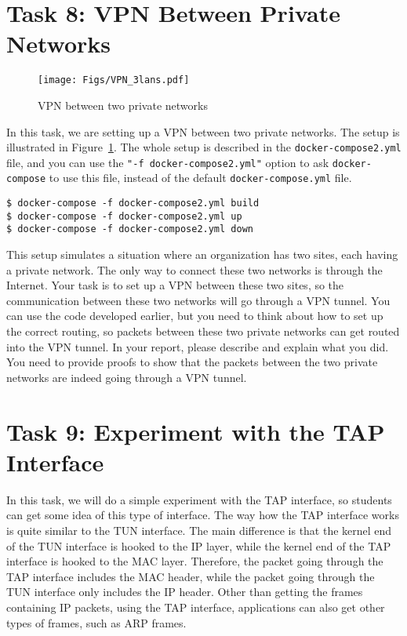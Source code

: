 \section{Task 8: VPN Between Private Networks} 


\begin{figure}[htb]
\begin{center}
\texttt{[image: Figs/VPN\_3lans.pdf]}
\end{center}
\caption{VPN between two private networks}
\label{vpn:fig:two-private-network}
\end{figure}
 
In this task, we are setting up a VPN between two private networks.
The setup is illustrated in Figure~\ref{vpn:fig:two-private-network}.
The whole setup is described in the \texttt{docker-compose2.yml} file, 
and you can use the \texttt{"-f docker-compose2.yml"} option to ask
\texttt{docker-compose} to use this file, instead of the 
default \texttt{docker-compose.yml} file. 


\begin{lstlisting}
$ docker-compose -f docker-compose2.yml build
$ docker-compose -f docker-compose2.yml up
$ docker-compose -f docker-compose2.yml down
\end{lstlisting}


This setup simulates a situation where an organization has two sites, 
each having a private network. The only way to connect these two
networks is through the Internet. 
Your task is to set up a VPN between these two sites, so
the communication between these two networks will go 
through a VPN tunnel. You can use the code developed earlier,
but you need to think about how to set up the correct routing,
so packets between these two private networks can 
get routed into the VPN tunnel. 
In your report, please describe and explain what you did.
You need to provide proofs to show that the packets 
between the two private networks are indeed going through
a VPN tunnel. 


\section{Task 9: Experiment with the TAP Interface}


In this task, we will do a simple experiment with the TAP interface, so students
can get some idea of this type of interface. The way how the TAP interface works is 
quite similar to the TUN interface. The main difference is that the 
kernel end of the TUN interface is hooked to the IP layer, while the 
kernel end of the TAP interface is hooked to the MAC layer. 
Therefore, the packet going through the TAP interface includes the MAC header,
while the packet going through the TUN interface only includes the IP header. 
Other than getting the frames containing IP packets, using the TAP interface, 
applications can also get other types of frames, such as ARP frames. 


